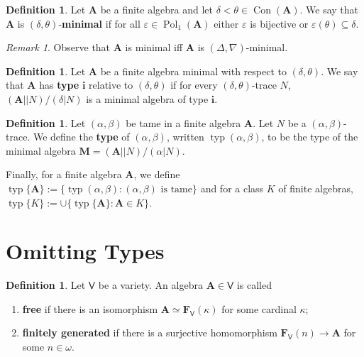 \documentclass{amsart}
\theoremstyle{plain}
\theoremstyle{definition}
\newtheorem{definition}[theorem]{Definition}
\theoremstyle{remark}
\newtheorem{remark}[theorem]{Remark}
\def\epsilon{\varepsilon}
\DeclareMathOperator{\Con}{Con}
\DeclareMathOperator{\Pol}{Pol}
\DeclareMathOperator{\typ}{typ}
\begin{document}
\begin{definition}
    Let $\mathbf{A}$ be a finite algebra and let $\delta < \theta \in \Con(\mathbf{A})$. 
    We say that $\mathbf{A}$ is $(\delta, \theta)$-\textbf{minimal} if for all $\epsilon \in \Pol_1(\mathbf{A})$ either $\epsilon$ is bijective or $\epsilon(\theta) \subseteq \delta$. 
\end{definition}

\begin{remark}
    Observe that $\mathbf{A}$ is minimal iff $\mathbf{A}$ is $(\Delta, \nabla)$-minimal. 
\end{remark}

\begin{definition}
    Let $\mathbf{A}$ be a finite algebra minimal with respect to $(\delta, \theta)$. 
    We say that $\mathbf{A}$ has \textbf{type} $\mathbf{i}$ relative to $(\delta, \theta)$ if for every $(\delta, \theta)$-trace $N$, 
    $(\mathbf{A}||N)/(\delta|N)$ is a minimal algebra of type $\mathbf{i}$. 
\end{definition}

\begin{definition}
    Let $(\alpha, \beta)$ be tame in a finite algebra $\mathbf{A}$. 
    Let $N$ be a $(\alpha,\beta)$-trace. 
    We define the \textbf{type} of $(\alpha, \beta)$, written $\typ(\alpha, \beta)$, to be the type of the minimal algebra $\mathbf{M}=(\mathbf{A}||N)/(\alpha|N)$. 
\end{definition}

Finally, for a finite algebra $\mathbf{A}$, we define $\typ\{\mathbf{A}\}:=\{\typ(\alpha, \beta): (\alpha, \beta) \text{ is tame}\}$ and for a class $K$ of finite algebras, $\typ\{K\}:=\cup\{\typ\{\mathbf{A}\} : \mathbf{A} \in K\}$. 

\section{Omitting Types}

\begin{definition}
    Let $\mathsf{V}$ be a variety. 
    An algebra $\mathbf{A} \in \mathsf{V}$ is called
    \begin{enumerate}
        \item \textbf{free} if there is an isomorphism $\mathbf{A} \simeq \mathbf{F}_{\mathsf{V}}(\kappa)$ for some cardinal $\kappa$; 
        \item \textbf{finitely generated} if there is a surjective homomorphism $\mathbf{F}_{\mathsf{V}}(n) \to \mathbf{A}$ for some $n \in \omega$. 
    \end{enumerate} 
\end{definition}
\end{document}
